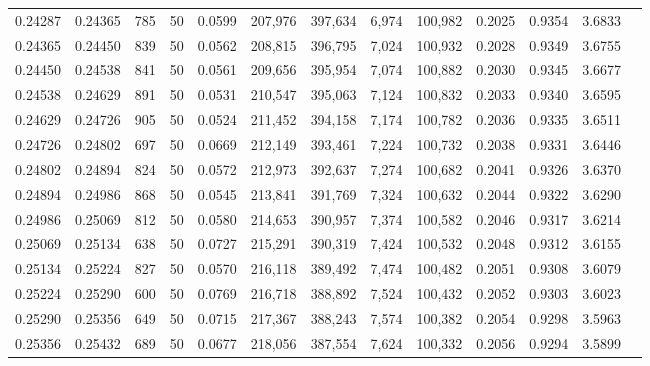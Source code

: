 \begin{tabular}{rrrrrrrrrrrrr}
0.24287 & 0.24365 &   785 &  50 &                                     0.0599 & 207,976 & 397,634 &   6,974 & 100,982 & 0.2025 & 0.9354 & 3.6833 \\
0.24365 & 0.24450 &   839 &  50 &                                     0.0562 & 208,815 & 396,795 &   7,024 & 100,932 & 0.2028 & 0.9349 & 3.6755 \\
0.24450 & 0.24538 &   841 &  50 &                                     0.0561 & 209,656 & 395,954 &   7,074 & 100,882 & 0.2030 & 0.9345 & 3.6677 \\
0.24538 & 0.24629 &   891 &  50 &                                     0.0531 & 210,547 & 395,063 &   7,124 & 100,832 & 0.2033 & 0.9340 & 3.6595 \\
0.24629 & 0.24726 &   905 &  50 &                                     0.0524 & 211,452 & 394,158 &   7,174 & 100,782 & 0.2036 & 0.9335 & 3.6511 \\
0.24726 & 0.24802 &   697 &  50 &                                     0.0669 & 212,149 & 393,461 &   7,224 & 100,732 & 0.2038 & 0.9331 & 3.6446 \\
0.24802 & 0.24894 &   824 &  50 &                                     0.0572 & 212,973 & 392,637 &   7,274 & 100,682 & 0.2041 & 0.9326 & 3.6370 \\
0.24894 & 0.24986 &   868 &  50 &                                     0.0545 & 213,841 & 391,769 &   7,324 & 100,632 & 0.2044 & 0.9322 & 3.6290 \\
0.24986 & 0.25069 &   812 &  50 &                                     0.0580 & 214,653 & 390,957 &   7,374 & 100,582 & 0.2046 & 0.9317 & 3.6214 \\
0.25069 & 0.25134 &   638 &  50 &                                     0.0727 & 215,291 & 390,319 &   7,424 & 100,532 & 0.2048 & 0.9312 & 3.6155 \\
0.25134 & 0.25224 &   827 &  50 &                                     0.0570 & 216,118 & 389,492 &   7,474 & 100,482 & 0.2051 & 0.9308 & 3.6079 \\
0.25224 & 0.25290 &   600 &  50 &                                     0.0769 & 216,718 & 388,892 &   7,524 & 100,432 & 0.2052 & 0.9303 & 3.6023 \\
0.25290 & 0.25356 &   649 &  50 &                                     0.0715 & 217,367 & 388,243 &   7,574 & 100,382 & 0.2054 & 0.9298 & 3.5963 \\
0.25356 & 0.25432 &   689 &  50 &                                     0.0677 & 218,056 & 387,554 &   7,624 & 100,332 & 0.2056 & 0.9294 & 3.5899 \\

\end{tabular}
